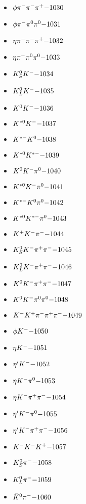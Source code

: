 \begin{multicols}{3}
\begin{itemize}
 \item $ \phi \pi^{-} \pi^{-} \pi^{+} \hfill{-1030}$
 \item $ \phi \pi^{-} \pi^{0} \pi^{0} \hfill{-1031}$
 \item $ \eta \pi^{-} \pi^{-} \pi^{+} \hfill{-1032}$
 \item $ \eta \pi^{-} \pi^{0} \pi^{0} \hfill{-1033}$
 \item $ K_{S}^{0} K^{-} \hfill{-1034}$
 \item $ K_{L}^{0} K^{-} \hfill{-1035}$
 \item $ K^{0} K^{-} \hfill{-1036}$
 \item $ K^{*0} K^{-} \hfill{-1037}$
 \item $ K^{*-} K^{0} \hfill{-1038}$
 \item $ K^{*0} K^{*-} \hfill{-1039}$
 \item $ K^{0} K^{-} \pi^{0} \hfill{-1040}$
 \item $ K^{*0} K^{-} \pi^{0} \hfill{-1041}$
 \item $ K^{*-} K^{0} \pi^{0} \hfill{-1042}$
 \item $ K^{*0} K^{*-} \pi^{0} \hfill{-1043}$
 \item $ K^{+} K^{-} \pi^{-} \hfill{-1044}$
 \item $ K_{S}^{0} K^{-} \pi^{+} \pi^{-} \hfill{-1045}$
 \item $ K_{L}^{0} K^{-} \pi^{+} \pi^{-} \hfill{-1046}$
 \item $ K^{0} K^{-} \pi^{+} \pi^{-} \hfill{-1047}$
 \item $ K^{0} K^{-} \pi^{0} \pi^{0} \hfill{-1048}$
 \item $ K^{-} K^{+} \pi^{-} \pi^{+} \pi^{-} \hfill{-1049}$
 \item $ \phi K^{-} \hfill{-1050}$
 \item $ \eta K^{-} \hfill{-1051}$
 \item $ {\eta^{\prime}} K^{-} \hfill{-1052}$
 \item $ \eta K^{-} \pi^{0} \hfill{-1053}$
 \item $ \eta K^{-} \pi^{+} \pi^{-} \hfill{-1054}$
 \item $ {\eta^{\prime}} K^{-} \pi^{0} \hfill{-1055}$
 \item $ {\eta^{\prime}} K^{-} \pi^{+} \pi^{-} \hfill{-1056}$
 \item $ K^{-} K^{-} K^{+} \hfill{-1057}$
 \item $ K_{S}^{0} \pi^{-} \hfill{-1058}$
 \item $ K_{L}^{0} \pi^{-} \hfill{-1059}$
 \item $ \bar{K}^{0} \pi^{-} \hfill{-1060}$

\end{itemize}
\end{multicols}
